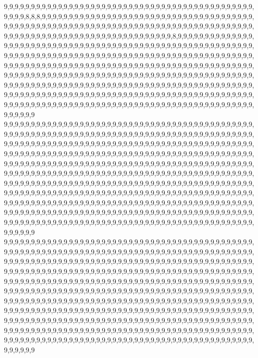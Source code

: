 9,9,9,9,9,9,9,9,9,9,9,9,9,9,9,9,9,9,9,9,9,9,9,9,9,9,9,9,9,9,9,9,9,9,9,9,9,9,9,9,9,9,9,9,9,9,9,9,9,9,8,8,8,9,9,9,9,9,9,9,9,9,9,9,9,9,9,9,9,9,9,9,9,9,9,9,9,9,9,9,9,9,9,9,9,9,9,9,9,9,9,9,9,9,9,9,9,9,9,9,9,9,9,9,9,9,9,9,9,9,9,9,9,9,9,9,9,9,9,9,9,9,9,9,9,9,9,9,9,9,9,9,9,9,9,9,9,9,9,9,9,9,9,9,9,9,9,9,9,9,9,9,9,9,9,9,9,9,9,9,9,9,9,9,9,9,9,9,9,8,9,9,9,9,9,9,9,9,9,9,9,9,9,9,9,9,9,9,9,9,9,9,9,9,9,9,9,9,9,9,9,9,9,9,9,9,9,9,9,9,9,9,9,9,9,9,9,9,9,9,9,9,9,9,9,9,9,9,9,9,9,9,9,9,9,9,9,9,9,9,9,9,9,9,9,9,9,9,9,9,9,9,9,9,9,9,9,9,9,9,9,9,9,9,9,9,9,9,9,9,9,9,9,9,9,9,9,9,9,9,9,9,9,9,9,9,9,9,9,9,9,9,9,9,9,9,9,9,9,9,9,9,9,9,9,9,9,9,9,9,9,9,9,9,9,9,9,9,9,9,9,9,9,9,9,9,9,9,9,9,9,9,9,9,9,9,9,9,9,9,9,9,9,9,9,9,9,9,9,9,9,9,9,9,9,9,9,9,9,9,9,9,9,9,9,9,9,9,9,9,9,9,9,9,9,9,9,9,9,9,9,9,9,9,9,9,9,9,9,9,9,9,9,9,9,9,9,9,9,9,9,9,9,9,9,9,9,9,9,9,9,9,9,9,9,9,9,9,9,9,9,9,9,9,9,9,9,9,9,9,9,9,9,9,9,9,9,9,9,9,9,9,9,9,9,9,9,9,9,9,9,9,9,9,9,9,9,9,9,9,9,9,9,9,9,9,9,9,9,9,9,9,9,9,9,9,9,9,9,9,9,9,9,9,9,9,9,9,9,9,9,9,9,9,9,9,9,9,9,9,9,9,9,9,9,9,9,9,9,9,9,9
9,9,9,9,9,9,9,9,9,9,9,9,9,9,9,9,9,9,9,9,9,9,9,9,9,9,9,9,9,9,9,9,9,9,9,9,9,9,9,9,9,9,9,9,9,9,9,9,9,9,9,9,9,9,9,9,9,9,9,9,9,9,9,9,9,9,9,9,9,9,9,9,9,9,9,9,9,9,9,9,9,9,9,9,9,9,9,9,9,9,9,9,9,9,9,9,9,9,9,9,9,9,9,9,9,9,9,9,9,9,9,9,9,9,9,9,9,9,9,9,9,9,9,9,9,9,9,9,9,9,9,9,9,9,9,9,9,9,9,9,9,9,9,9,9,9,9,9,9,9,9,9,9,9,9,9,9,9,9,9,9,9,9,9,9,9,9,9,9,9,9,9,9,9,9,9,9,9,9,9,9,9,9,9,9,9,9,9,9,9,9,9,9,9,9,9,9,9,9,9,9,9,9,9,9,9,9,9,9,9,9,9,9,9,9,9,9,9,9,9,9,9,9,9,9,9,9,9,9,9,9,9,9,9,9,9,9,9,9,9,9,9,9,9,9,9,9,9,9,9,9,9,9,9,9,9,9,9,9,9,9,9,9,9,9,9,9,9,9,9,9,9,9,9,9,9,9,9,9,9,9,9,9,9,9,9,9,9,9,9,9,9,9,9,9,9,9,9,9,9,9,9,9,9,9,9,9,9,9,9,9,9,9,9,9,9,9,9,9,9,9,9,9,9,9,9,9,9,9,9,9,9,9,9,9,9,9,9,9,9,9,9,9,9,9,9,9,9,9,9,9,9,9,9,9,9,9,9,9,9,9,9,9,9,9,9,9,9,9,9,9,9,9,9,9,9,9,9,9,9,9,9,9,9,9,9,9,9,9,9,9,9,9,9,9,9,9,9,9,9,9,9,9,9,9,9,9,9,9,9,9,9,9,9,9,9,9,9,9,9,9,9,9,9,9,9,9,9,9,9,9,9,9,9,9,9,9,9,9,9,9,9,9,9,9,9,9,9,9,9,9,9,9,9,9,9,9,9,9,9,9,9,9,9,9,9,9,9,9,9,9,9,9,9,9,9,9,9,9,9,9,9,9,9,9,9,9,9,9,9,9,9,9,9,9,9,9,9,9,9,9,9,9,9,9,9,9,9,9,9,9,9
9,9,9,9,9,9,9,9,9,9,9,9,9,9,9,9,9,9,9,9,9,9,9,9,9,9,9,9,9,9,9,9,9,9,9,9,9,9,9,9,9,9,9,9,9,9,9,9,9,9,9,9,9,9,9,9,9,9,9,9,9,9,9,9,9,9,9,9,9,9,9,9,9,9,9,9,9,9,9,9,9,9,9,9,9,9,9,9,9,9,9,9,9,9,9,9,9,9,9,9,9,9,9,9,9,9,9,9,9,9,9,9,9,9,9,9,9,9,9,9,9,9,9,9,9,9,9,9,9,9,9,9,9,9,9,9,9,9,9,9,9,9,9,9,9,9,9,9,9,9,9,9,9,9,9,9,9,9,9,9,9,9,9,9,9,9,9,9,9,9,9,9,9,9,9,9,9,9,9,9,9,9,9,9,9,9,9,9,9,9,9,9,9,9,9,9,9,9,9,9,9,9,9,9,9,9,9,9,9,9,9,9,9,9,9,9,9,9,9,9,9,9,9,9,9,9,9,9,9,9,9,9,9,9,9,9,9,9,9,9,9,9,9,9,9,9,9,9,9,9,9,9,9,9,9,9,9,9,9,9,9,9,9,9,9,9,9,9,9,9,9,9,9,9,9,9,9,9,9,9,9,9,9,9,9,9,9,9,9,9,9,9,9,9,9,9,9,9,9,9,9,9,9,9,9,9,9,9,9,9,9,9,9,9,9,9,9,9,9,9,9,9,9,9,9,9,9,9,9,9,9,9,9,9,9,9,9,9,9,9,9,9,9,9,9,9,9,9,9,9,9,9,9,9,9,9,9,9,9,9,9,9,9,9,9,9,9,9,9,9,9,9,9,9,9,9,9,9,9,9,9,9,9,9,9,9,9,9,9,9,9,9,9,9,9,9,9,9,9,9,9,9,9,9,9,9,9,9,9,9,9,9,9,9,9,9,9,9,9,9,9,9,9,9,9,9,9,9,9,9,9,9,9,9,9,9,9,9,9,9,9,9,9,9,9,9,9,9,9,9,9,9,9,9,9,9,9,9,9,9,9,9,9,9,9,9,9,9,9,9,9,9,9,9,9,9,9,9,9,9,9,9,9,9,9,9,9,9,9,9,9,9,9,9,9,9,9,9,9,9,9,9,9,9,9,9,9,9,9,9,9,9
